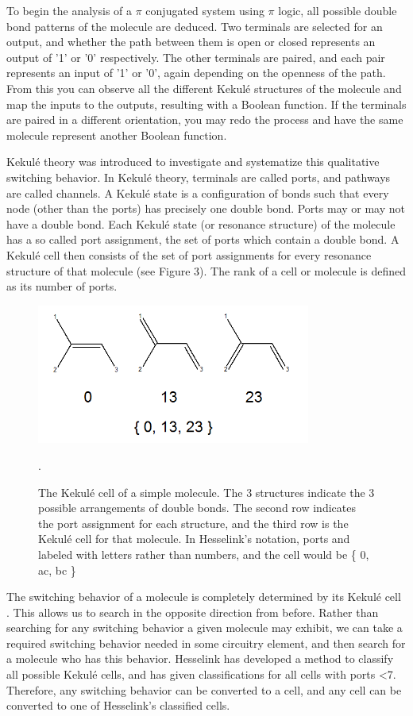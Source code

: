\documentclass[12pt]{article}
\begin{document}
To begin the analysis of a $\pi$ conjugated system using $\pi$ logic, all possible double bond patterns of the molecule are deduced. Two terminals are selected for an output, and whether the path between them is open or closed represents an output of '1' or '0' respectively. The other terminals are paired, and each pair represents an input of '1' or '0', again depending on the openness of the path. From this you can observe all the different Kekul\'e structures of the molecule and map the inputs to the outputs, resulting with a Boolean function. If the terminals are paired in a different orientation, you may redo the process and have the same molecule represent another Boolean function. 

Kekul\'e theory was introduced \cite{HH13} to investigate and systematize this qualitative switching behavior. In Kekul\'e theory, terminals are called ports, and pathways are called channels. A Kekul\'e state is a configuration of bonds such that every node (other than the ports) has precisely one double bond. Ports may or may not have a double bond. Each Kekul\'e state (or resonance structure) of the molecule has a so called port assignment, the set of ports which contain a double bond. A Kekul\'e cell then consists of the set of port assignments for every resonance structure of that molecule (see Figure 3). The rank of a cell or molecule is defined as its number of ports.

\begin{figure}[ht!]
\centering
\includegraphics[width=90mm]{KekuleCell.png}
\caption{The Kekul\'e cell of a simple molecule. The 3 structures indicate the 3 possible arrangements of double bonds. The second row indicates the port assignment for each structure, and the third row is the Kekul\'e cell for that molecule. In Hesselink's notation, ports and labeled with letters rather than numbers, and the cell would be \{ 0, ac, bc \} }.
\end{figure}
The switching behavior of a molecule is completely determined by its Kekul\'e cell \cite{HH13, H13}. This allows us to search in the opposite direction from before. Rather than searching for any switching behavior a given molecule may exhibit, we can take a required switching behavior needed in some circuitry element, and then search for a molecule who has this behavior. Hesselink \cite{H13} has developed a method to classify all possible Kekul\'e cells, and has given classifications for all cells with ports \textless 7. Therefore, any switching behavior can be converted to a cell, and any cell can be converted to one of Hesselink's \cite{H13} classified cells.
\end{document}
